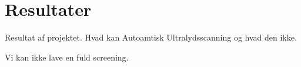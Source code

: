 \chapter{Resultater}\label{kapitel_Resultater}

Resultat af projektet. Hvad kan Autoamtisk Ultralydsscanning og hvad den ikke. 

Vi kan ikke lave en fuld screening. 

